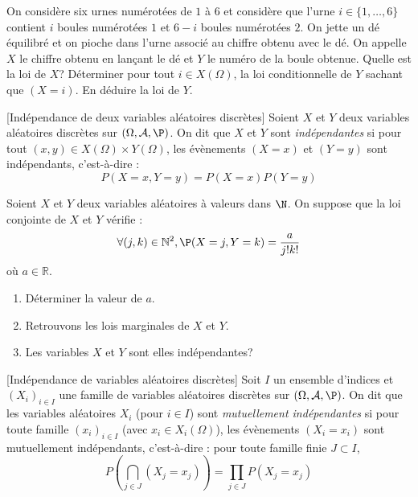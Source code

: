 \documentclass[french,11pt,twoside]{VcCours}
\begin{document}
\begin{Exemple}{} On considère six urnes numérotées de $1$ à $6$ et considère que l'urne $i \in \lbrace 1, \ldots, 6 \rbrace$ contient $i$ boules numérotées $1$ et $6-i$ boules numérotées $2$. On jette un dé équilibré et on pioche dans l'urne associé au chiffre obtenu avec le dé. On appelle $X$ le chiffre obtenu en lançant le dé et $Y$ le numéro de la boule obtenue. Quelle est la loi de $X$? Déterminer pour tout $i \in X(\Omega)$, la loi conditionnelle de $Y$ sachant que $(X=i)$. En déduire la loi de $Y$.

\vspace{10cm}
\end{Exemple}


\begin{Definition}{}[Indépendance de deux variables aléatoires discrètes]
Soient $X$ et $Y$ deux variables aléatoires discrètes sur $(\Omega, \mathcal{A}, \P)$. On dit que $X$ et $Y$ sont \emph{indépendantes} si pour tout $(x,y) \in X(\Omega) \times Y(\Omega)$, les évènements $(X=x)$ et $(Y=y)$ sont indépendants, c'est-à-dire :
$$ P(X=x,Y=y)=P(X=x)P(Y=y)$$
\end{Definition}

\begin{Exemple}{} Soient $X$ et $Y$ deux variables aléatoires à valeurs dans $\N$. On suppose que la loi conjointe de $X$ et $Y$ vérifie :
  \[
  \forall (j,k) \in \mathbb{N}^2,  \P( X = j,Y = k ) = \frac{a}{j!k!}
  \]
où $a \in \mathbb{R}$.
  \begin{enumerate}
  \item
    Déterminer la valeur de $a$.
    
    \vspace{4cm}
  \item
    Retrouvons les lois marginales de $X$ et $Y$.
    
    \vspace{5cm}
  \item
    Les variables $X$ et $Y$ sont elles indépendantes?
    
    \vspace{3cm}
  \end{enumerate}
\end{Exemple}

\begin{Definition}{}[Indépendance de variables aléatoires discrètes]
Soit $I$ un ensemble d'indices et $(X_i)_{i \in I}$ une famille de variables aléatoires discrètes sur $(\Omega, \mathcal{A}, \P)$. On dit que les variables aléatoires $X_i$ (pour $i \in I$) sont \emph{mutuellement indépendantes} si pour toute famille $(x_i)_{i \in I}$ (avec $x_i \in X_i(\Omega)$), les évènements $(X_i=x_i)$ sont mutuellement indépendants, c'est-à-dire : pour toute famille finie $J \subset I$,
$$ P \left( \bigcap_{j \in J} (X_j=x_j) \right) = \prod_{j \in J} P(X_j=x_j)$$
\end{Definition}
\end{document}

